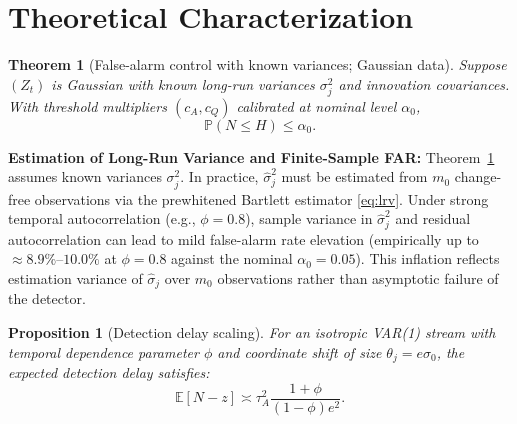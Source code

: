 \documentclass[11pt]{article}
\newtheorem{theorem}{Theorem}
\newtheorem{proposition}{Proposition}
\begin{document}
\section{Theoretical Characterization}
\begin{theorem}[False-alarm control with known variances; Gaussian data] \label{thm:fac}
    Suppose $(Z_t)$ is Gaussian with known long-run variances $\sigma_j^2$ and innovation covariances. With threshold multipliers $(c_A, c_Q)$ calibrated at nominal level $\alpha_0$,
    \begin{equation}
        \mathbb{P}(N \le H) \le \alpha_0.
    \end{equation}
\end{theorem}
\noindent\textbf{Estimation of Long-Run Variance and Finite-Sample FAR:} Theorem~\ref{thm:fac} assumes known variances $\sigma_j^2$. In practice, $\hat{\sigma}_j^2$ must be estimated from $m_0$ change-free observations via the prewhitened Bartlett estimator \eqref{eq:lrv}. Under strong temporal autocorrelation (e.g., $\phi = 0.8$), sample variance in $\hat{\sigma}_j^2$ and residual autocorrelation can lead to mild false-alarm rate elevation (empirically up to $\approx 8.9\%$--$10.0\%$ at $\phi = 0.8$ against the nominal $\alpha_0 = 0.05$). This inflation reflects estimation variance of $\hat{\sigma}_j$ over $m_0$ observations rather than asymptotic failure of the detector.

\begin{proposition}[Detection delay scaling]
    For an isotropic VAR(1) stream with temporal dependence parameter $\phi$ and coordinate shift of size $\theta_j = e \sigma_0$, the expected detection delay satisfies:
    \begin{equation}
        \mathbb{E}[N - z] \asymp \tau_A^2 \frac{1 + \phi}{(1 - \phi) e^2}.
    \end{equation}
\end{proposition}
\end{document}
